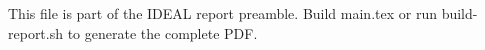 \documentclass[11pt,a4paper,oneside]{report}
\begin{document}
  This file is part of the IDEAL report preamble. Build main.tex or run
  build-report.sh to generate the complete PDF.
  
\end{document}
